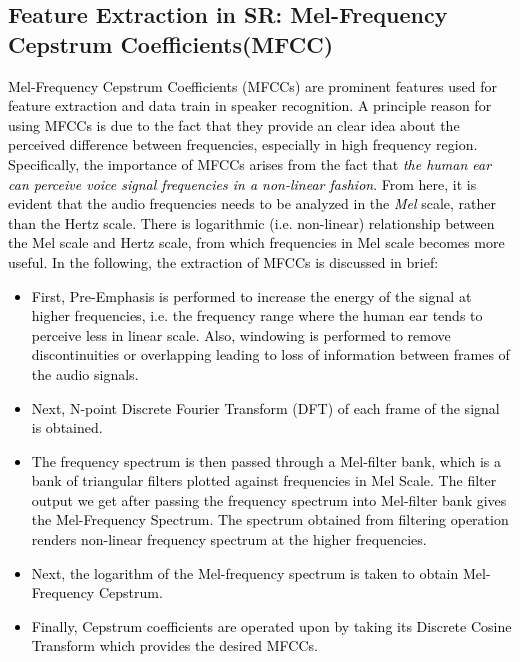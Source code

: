 \documentclass{article}
\begin{document}
\subsection{Feature Extraction in SR: Mel-Frequency Cepstrum Coefficients(MFCC)}
\textcolor{black}{Mel-Frequency Cepstrum Coefficients (MFCCs) are prominent features used for feature extraction and data train in speaker recognition. A principle reason for using MFCCs is due to the fact that they provide an clear idea about the perceived difference between frequencies, especially in high frequency region. Specifically, the importance of MFCCs arises from the fact that \textit{the human ear can perceive voice signal frequencies in a non-linear fashion}. From here, 
it is evident that the audio frequencies needs to be analyzed in the \textit{Mel} scale, rather than the {Hertz} scale. There is logarithmic (i.e. non-linear) relationship between the Mel scale and Hertz scale, from which frequencies in Mel scale becomes more useful. In the following, the extraction of MFCCs is discussed in brief:
\begin{itemize}
\item First, Pre-Emphasis is performed to increase the energy of the signal at higher frequencies, i.e. the frequency range where the human ear tends to perceive less in linear scale. Also, windowing is performed to remove discontinuities or overlapping leading to loss of information between frames of the audio signals.
\item Next, N-point Discrete Fourier Transform (DFT) of each frame of the signal is obtained.%
\item The frequency spectrum is then passed through a Mel-filter bank, which is a bank of triangular filters plotted against frequencies in Mel Scale. %
The filter output we get after passing the frequency spectrum into Mel-filter bank gives the Mel-Frequency Spectrum. The spectrum obtained from filtering operation renders non-linear frequency spectrum at the higher frequencies.%
\item Next, the logarithm of the Mel-frequency spectrum is taken to obtain Mel-Frequency Cepstrum.
\item Finally, Cepstrum coefficients are operated upon by taking its Discrete Cosine Transform which provides the desired MFCCs.%
\end{itemize}
}
\end{document}
